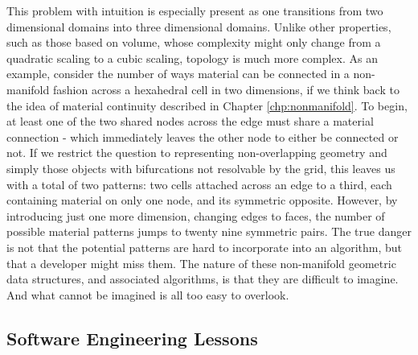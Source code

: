 This problem with intuition is especially present as one transitions from two
dimensional domains into three dimensional domains. Unlike other
properties, such as those based on volume, whose complexity might only
change from a quadratic scaling to a cubic scaling, topology is much
more complex. As an example, consider the number of ways material can
be connected in a non-manifold fashion across a hexahedral cell in two
dimensions, if we think back to the idea of material continuity
described in Chapter \ref{chp:nonmanifold}. To begin, at least one of
the two shared nodes across the edge must share a material connection
- which immediately leaves the other node to either be connected or
not. If we restrict the question to representing non-overlapping
geometry and simply those objects with bifurcations not resolvable by
the grid, this leaves us with a total of two patterns: two cells
attached across an edge to a third, each containing material on only
one node, and its symmetric opposite. However, by introducing just one more
dimension, changing edges to faces, the number of possible material
patterns jumps to twenty nine symmetric pairs. The true danger is not
that the potential patterns are hard to incorporate into an algorithm,
but that a developer might miss them. The nature of these non-manifold
geometric data structures, and associated algorithms, is that they are
difficult to imagine. And what cannot be imagined is all too easy to
overlook.

\subsection{Software Engineering Lessons}

